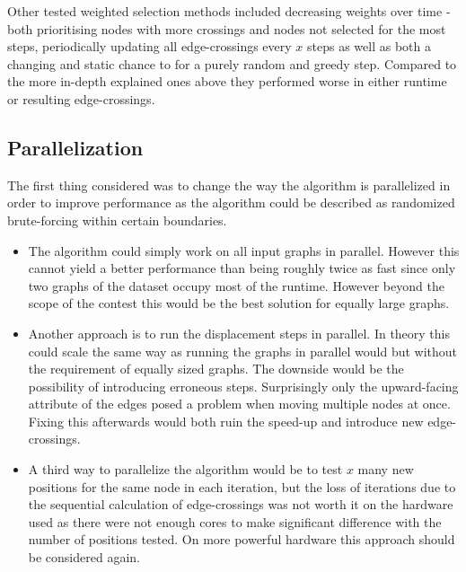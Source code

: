 \documentclass[]{llncs}
\begin{document}
	Other tested weighted selection methods included decreasing weights over time - both prioritising nodes with more crossings and nodes not selected for the most steps, periodically updating all edge-crossings every $x$ steps as well as both a changing and static chance to for a purely random and greedy step. Compared to the more in-depth explained ones above they performed worse in either runtime or resulting edge-crossings.

    \subsection{Parallelization}
	The first thing considered was to change the way the algorithm is parallelized in order to improve performance as the algorithm could be described as randomized brute-forcing within certain boundaries. 
	\begin{itemize}
		\item The algorithm could simply work on all input graphs in parallel. However this cannot yield a better performance than being roughly twice as fast since only two graphs of the dataset occupy most of the runtime. However beyond the scope of the contest this would be the best solution for equally large graphs.
		\item Another approach is to run the displacement steps in parallel. In theory this could scale the same way as running the graphs in parallel would but without the requirement of equally sized graphs. The downside would be the possibility of introducing erroneous steps. Surprisingly only the upward-facing attribute of the edges posed a problem when moving multiple nodes at once. Fixing this afterwards would both ruin the speed-up and introduce new edge-crossings.
        \item A third way to parallelize the algorithm would be to test $x$ many new positions for the same node in each iteration, but the loss of iterations due to the sequential calculation of edge-crossings was not worth it on the hardware used as there were not enough cores to make significant difference with the number of positions tested. On more powerful hardware this approach should be considered again.
	\end{itemize}
	
\end{document}
